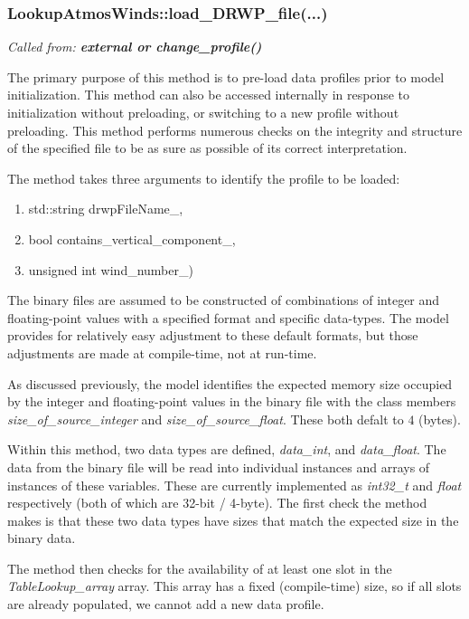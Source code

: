 \documentclass[11pt,fleqn]{report}
\begin{document}
\subsubsection{LookupAtmosWinds::load\_DRWP\_file(...)}
\textit{Called from: \textbf{external or change\_profile()}}

The primary purpose of this method is to pre-load data profiles prior to
model initialization. This method can also be accessed internally in
response to initialization without preloading, or switching to a new profile
without preloading. This method performs numerous checks on the integrity
and structure  of
the specified file to be as sure as possible of its correct interpretation.

The method takes three arguments to identify the profile to be loaded:
\begin{enumerate}
\item std::string drwpFileName\_,
\item bool contains\_vertical\_component\_,
\item unsigned int wind\_number\_)
\end{enumerate}

The binary files are assumed to be constructed of combinations of integer
and floating-point values with a specified format and specific data-types.
The model provides for relatively easy adjustment to these default formats,
but those adjustments are made at compile-time, not at run-time.

As discussed previously, the model identifies the expected memory size
occupied by the integer and floating-point values in the binary file with
the class members \textit{size\_of\_source\_integer} and
\textit{size\_of\_source\_float}. These both defalt to $4$ (bytes).

Within this method, two data types are defined, \textit{data\_int}, and
\textit{data\_float}. The data from the binary file will be read into
individual instances and arrays of instances of these variables. These
are currently implemented as \textit{int32\_t} and \textit{float}
respectively (both of which are 32-bit / 4-byte). The first
check the method makes is that these two data types have sizes that match
the expected size in the binary data.

The method then checks for the availability of at least one slot in the
\textit{TableLookup\_array} array. This array has a fixed (compile-time)
size, so if all slots are already populated, we cannot add a new data
profile.
\end{document}
